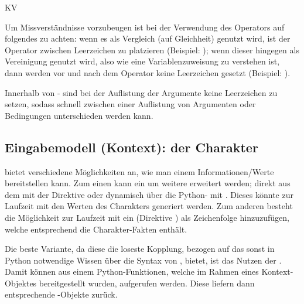 \begin{enumerateWithCode}{KV}
    \item Um Missverständnisse vorzubeugen ist bei der Verwendung des Operators \textquote{=} auf folgendes zu achten:
    wenn es als Vergleich (auf Gleichheit) genutzt wird, ist der Operator zwischen Leerzeichen zu platzieren (Beispiel: );
    wenn dieser hingegen als Vereinigung genutzt wird, also wie eine Variablenzuweisung zu verstehen ist, dann werden vor und nach dem Operator keine Leerzeichen gesetzt (Beispiel: ).

    \item Innerhalb von - sind bei der Auflistung der Argumente keine Leerzeichen zu setzen, sodass schnell zwischen einer Auflistung von Argumenten oder Bedingungen unterschieden werden kann.
\end{enumerateWithCode}


\subsection{Eingabemodell (Kontext): der Charakter}\label{subsec:eingabemodell-(kontext):-der-charakter}

 bietet verschiedene Möglichkeiten an, wie man einem  Informationen/Werte bereitstellen kann.
Zum einen kann ein  um weitere  erweitert werden;
direkt aus dem  mit der Direktive  oder dynamisch über die Python- mit .
Dieses  könnte zur Laufzeit mit den Werten des Charakters generiert werden.
Zum anderen besteht die Möglichkeit zur Laufzeit mit  ein \sog {} (Direktive ) als Zeichenfolge hinzuzufügen, welche entsprechend die Charakter-Fakten enthält.

Die beste Variante, da diese die loseste Kopplung, bezogen auf das sonst in Python notwendige Wissen über die Syntax von , bietet, ist das Nutzen der .
Damit können aus einem  Python-Funktionen, welche im Rahmen eines Kontext-Objektes bereitgestellt wurden, aufgerufen werden.
Diese liefern dann entsprechende -Objekte zurück.

